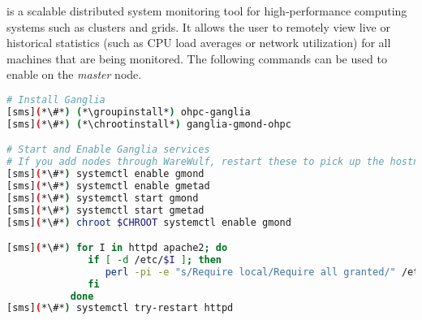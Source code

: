 \Ganglia{} is a scalable distributed system monitoring tool for high-performance
computing systems such as clusters and grids. It allows the user to remotely
view live or historical statistics (such as CPU load averages or network
utilization) for all machines that are being monitored. The following commands
can be used to enable \Ganglia{} on the {\em master} node.

\begin{lstlisting}[language=bash,keywords={},upquote=true]
# Install Ganglia
[sms](*\#*) (*\groupinstall*) ohpc-ganglia
[sms](*\#*) (*\chrootinstall*) ganglia-gmond-ohpc

# Start and Enable Ganglia services
# If you add nodes through WareWulf, restart these to pick up the hostnames rather than the IPs
[sms](*\#*) systemctl enable gmond
[sms](*\#*) systemctl enable gmetad
[sms](*\#*) systemctl start gmond
[sms](*\#*) systemctl start gmetad
[sms](*\#*) chroot $CHROOT systemctl enable gmond

[sms](*\#*) for I in httpd apache2; do
              if [ -d /etc/$I ]; then
                 perl -pi -e "s/Require local/Require all granted/" /etc/$I/conf.d/ganglia-ohpc.conf
              fi
           done 
[sms](*\#*) systemctl try-restart httpd
\end{lstlisting}

